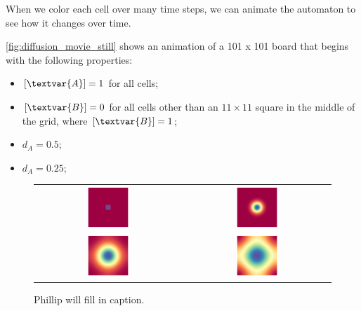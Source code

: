 When we color each cell over many time steps, we can animate the automaton to see how it changes over time.



\autoref{fig:diffusion_movie_still} shows an animation of a 101 x 101 board that begins with the following properties:
\begin{itemize}
\item $[\textvar{A}] = 1$ for all cells;
\item $[\textvar{B}] = 0$ for all cells other than an $11 \times 11$ square in the middle of the grid, where $[\textvar{B}] = 1$;
\item $d_A = 0.5$;
\item $d_A = 0.25$;
\end{itemize}

\begin{figure}[h]
\centering
\mySfFamily
\begin{tabular}{c c}
\includegraphics[width = 0.3\textwidth]{../images/diffusion__Moment_1.png} & \includegraphics[width = 0.3\textwidth]{../images/diffusion__Moment_2.png} \\[2ex]
\includegraphics[width = 0.3\textwidth]{../images/diffusion__Moment_3.png} & \includegraphics[width = 0.3\textwidth]{../images/diffusion__Moment_4.png}
\end{tabular}
\caption{Phillip will fill in caption.}
\label{fig:diffusion_movie_still}
\end{figure}

